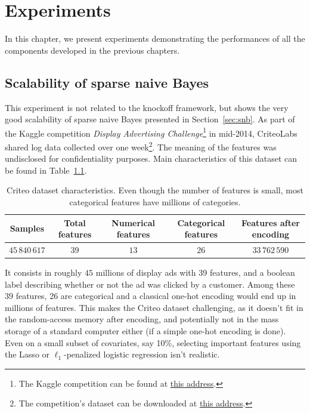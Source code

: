 \chapter{Experiments}\label{ch:exp}

In this chapter,
we present experiments demonstrating the performances of all the components developed in the previous chapters.

\section{Scalability of sparse naive Bayes}\label{sec:snb_criteo}

This experiment is not related to the knockoff framework,
but shows the very good scalability of sparse naive Bayes
presented in Section~\ref{sec:snb}.
As part of the Kaggle competition \emph{Display Advertising Challenge}\footnote{
    The Kaggle competition can be found at
    \href{https://www.kaggle.com/c/criteo-display-ad-challenge}{this address}.
}
in mid-2014, CriteoLabs shared log data collected over one week\footnote{
    The competition's dataset can be downloaded at
    \href{https://labs.criteo.com/2014/02/download-kaggle-display-advertising-challenge-dataset/}{this address}.
}.
The meaning of the features was undisclosed for confidentiality purposes.
Main characteristics of this dataset can be found in Table~\ref{tab:criteo_dataset}.
\begin{table}[!htb]
    \centering
    \setlength{\tabcolsep}{2pt}
    {\small
        \begin{tabular}{|c|c|c|c|c|}\hline
        \textbf{Samples} & \textbf{Total features} & \textbf{Numerical features} & \textbf{Categorical features} & \textbf{Features after encoding}\\ \hline
        $45\,840\,617$ & $39$  & $13$ & $26$ & $33\,762\,590$ \\ \hline
        \end{tabular}
    }%
    \caption[short]{
        Criteo dataset characteristics.
        Even though the number of features is small,
        most categorical features have millions of categories.
    }
    \label{tab:criteo_dataset}
\end{table}
It consists in roughly $45$ millions of display ads with 39 features,
and a boolean label describing whether or not the ad was clicked by a customer.
Among these 39 features, 26 are categorical and a classical one-hot encoding would end up in millions of features.
This makes the Criteo dataset challenging, as it doesn't fit in the random-access memory after encoding,
and potentially not in the mass storage of a standard computer either (if a simple one-hot encoding is done).
Even on a small subset of covariates, say 10\%,
selecting important features using the Lasso or $\ell_1$-penalized logistic regression isn't realistic.

